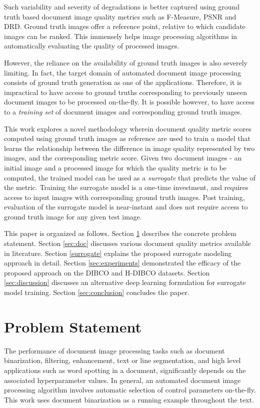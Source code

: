 \documentclass[10pt, a4paper, conference, compsocconf]{IEEEtran}
\begin{document}
Such variability and severity of degradations is better captured using ground truth based document image quality metrics such as F-Measure, PSNR and DRD. Ground truth images offer a reference point, relative to which candidate images can be ranked. This immensely helps image processing algorithms in automatically evaluating the quality of processed images.

However, the reliance on the availability of ground truth images is also severely limiting. In fact, the target domain of automated document image processing consists of ground truth generation as one of the applications. Therefore, it is impractical to have access to ground truths corresponding to previously unseen document images to be processed on-the-fly. It is possible however, to have access to a \emph{training set} of document images and corresponding ground truth images.

This work explores a novel methodology wherein document quality metric scores computed using ground truth images as reference are used to train a model that learns the relationship between the difference in image quality represented by two images, and the corresponding metric score. Given two document images - an initial image and a processed image for which the quality metric is to be computed, the trained model can be used as a \emph{surrogate} that predicts the value of the metric. Training the surrogate model is a one-time investment, and requires access to input images with corresponding ground truth images. Post training, evaluation of the surrogate model is near-instant and does not require access to ground truth image for any given test image.

This paper is organized as follows. Section \ref{sec:prob} describes the concrete problem statement. Section \ref{sec:doc} discusses various document quality metrics available in literature. Section \ref{surrogate} explains the proposed surrogate modeling approach in detail. Section \ref{sec:experiments} demonstrated the efficacy of the proposed approach on the DIBCO and H-DIBCO datasets. Section \ref{sec:discussion} discusses an alternative deep learning formulation for surrogate model training. Section \ref{sec:conclusion} concludes the paper.

\section{Problem Statement}
\label{sec:prob}

The performance of document image processing tasks such as document binarization, filtering, enhancement, text or line segmentation, and high level applications such as word spotting in a document, significantly depends on the associated hyperparameter values. In general, an automated document image processing algorithm involves automatic selection of control parameters on-the-fly. This work uses document binarization as a running example throughout the text. 
\end{document}
